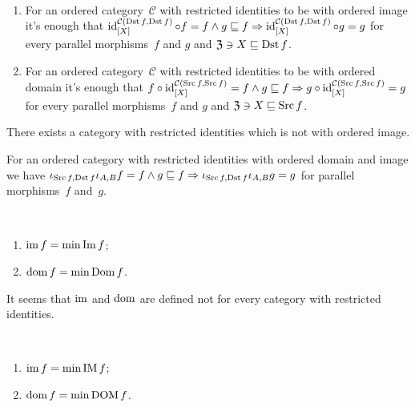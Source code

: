 \begin{obvious}
~
\begin{enumerate}
\item For an ordered category~$\mathcal{C}$ with restricted identities
to be with ordered image it's enough that
$\operatorname{id}^{\mathcal{C}(\operatorname{Dst} f,\operatorname{Dst} f)}_{[X]}\circ f=f\land
g\sqsubseteq f\Rightarrow
\operatorname{id}^{\mathcal{C}(\operatorname{Dst} f,\operatorname{Dst} f)}_{[X]}\circ g=g$
for every parallel morphisms~$f$ and $g$ and
$\mathfrak{Z}\ni X\sqsubseteq\operatorname{Dst} f$.
\item For an ordered category~$\mathcal{C}$ with restricted identities
to be with ordered domain it's enough that
$f\circ\operatorname{id}^{\mathcal{C}(\operatorname{Src} f,\operatorname{Src} f)}_{[X]}=f\land
g\sqsubseteq f\Rightarrow
g\circ\operatorname{id}^{\mathcal{C}(\operatorname{Src} f,\operatorname{Src} f)}_{[X]}=g$
for every parallel morphisms~$f$ and $g$ and
$\mathfrak{Z}\ni X\sqsubseteq\operatorname{Src} f$.
\end{enumerate}
\end{obvious}

\begin{conjecture}
There exists a category with restricted identities which
is not with ordered image.
\end{conjecture}

\begin{obvious}
For an ordered category with restricted identities with
ordered domain and image we have
$\iota_{\operatorname{Src} f,\operatorname{Dst} f}\iota_{A,B}f=f\land g\sqsubseteq f
\Rightarrow
\iota_{\operatorname{Src} f,\operatorname{Dst} f}\iota_{A,B}g=g$
for parallel morphisms~$f$ and~$g$.
\end{obvious}

\begin{defn}
~
\begin{enumerate}
\item $\operatorname{im} f = \min\operatorname{Im} f$;
\item $\operatorname{dom} f = \min\operatorname{Dom} f$.
\end{enumerate}
\end{defn}

\begin{note}
It seems that $\operatorname{im}$ and $\operatorname{dom}$ are defined not for every
category with restricted identities.
\end{note}

\begin{prop}
~
\begin{enumerate}
\item $\operatorname{im} f = \min\operatorname{IM} f$;
\item $\operatorname{dom} f = \min\operatorname{DOM} f$.
\end{enumerate}
\end{prop}

